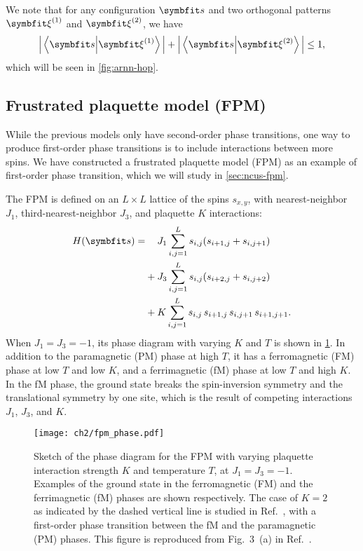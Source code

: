 We note that for any configuration $\vs$ and two orthogonal patterns $\vxi^{(1)}$ and $\vxi^{(2)}$, we have
\begin{equation}
\Big| \ip{\vs}{\vxi^{(1)}} \Big| + \Big| \ip{\vs}{\vxi^{(2)}} \Big| \le 1,
\end{equation}
which will be seen in \cref{fig:arnn-hop}.

\subsection{Frustrated plaquette model (FPM)}
\label{sec:fpm}

While the previous models only have second-order phase transitions, one way to produce first-order phase transitions is to include interactions between more spins. We have constructed a frustrated plaquette model (FPM) as an example of first-order phase transition, which we will study in \cref{sec:ncus-fpm}.

The FPM is defined on an $L \times L$ lattice of the spins $s_{x, y}$, with nearest-neighbor $J_1$, third-nearest-neighbor $J_3$, and plaquette $K$ interactions:
\begin{align}
H(\vs) = &\phantom{{}+{}} J_1 \sum_{i, j = 1}^L s_{i, j} (s_{i + 1, j} + s_{i, j + 1}) \nonumber \\
&+ J_3 \sum_{i, j = 1}^L s_{i, j} (s_{i + 2, j} + s_{i, j + 2}) \nonumber \\
&+ K \sum_{i, j = 1}^L s_{i, j} \, s_{i + 1, j} \, s_{i, j + 1} \, s_{i + 1, j + 1}.
\label{eq:fpm}
\end{align}
When $J_1 = J_3 = -1$, its phase diagram with varying $K$ and $T$ is shown in \cref{fig:fpm-phase}. In addition to the paramagnetic (PM) phase at high $T$, it has a ferromagnetic (FM) phase at low $T$ and low $K$, and a ferrimagnetic (fM) phase at low $T$ and high $K$. In the fM phase, the ground state breaks the spin-inversion symmetry and the translational symmetry by one site, which is the result of competing interactions $J_1$, $J_3$, and $K$.

\begin{figure}[htb]
\centering
\texttt{[image: ch2/fpm\_phase.pdf]}
\caption[Phase diagram of frustrated plaquette model (FPM)]{
Sketch of the phase diagram for the FPM with varying plaquette interaction strength $K$ and temperature $T$, at $J_1 = J_3 = -1$.
Examples of the ground state in the ferromagnetic (FM) and the ferrimagnetic (fM) phases are shown respectively.
The case of $K = 2$ as indicated by the dashed vertical line is studied in Ref.~\cite{wu2021unbiased}, with a first-order phase transition between the fM and the paramagnetic (PM) phases.
This figure is reproduced from Fig.~3~(a) in Ref.~\cite{wu2021unbiased}.
}
\label{fig:fpm-phase}
\end{figure}

